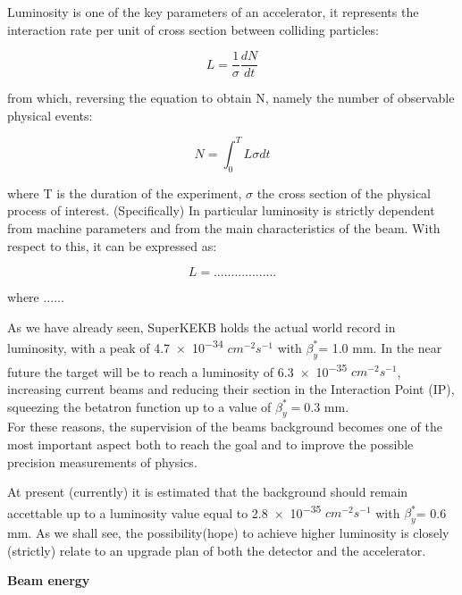 Luminosity is one of the key parameters of an accelerator, it represents the interaction rate per unit of cross section between colliding particles:

\begin{equation}
L =\frac{1}{\sigma}\frac{dN}{dt} 
\end{equation}

from which, reversing the equation to obtain N, namely the number of observable physical events:

\begin{equation}
N = \int_{0}^{T} L\sigma dt
\end{equation}

where T is the duration of the experiment,  $\sigma$ the cross section of the physical process of interest.
(Specifically) In particular luminosity is strictly dependent from machine parameters and from the main characteristics of the beam. With respect to this, it can be expressed as:

\begin{equation}
L = ..................
\end{equation}

where ......

\hspace{.1cm}
As we have already seen, SuperKEKB holds the actual world record in luminosity, with a peak of \num{4.7e-34} $cm^{-2}s^{-1}$ with $\beta^{*}_{y}$= 1.0 mm. In the near future the target will be to reach a luminosity of \num{6.3e-35} $cm^{-2} s^{-1}$, increasing current beams and reducing their section in the Interaction Point (IP), squeezing the betatron function up to a value of $\beta^{*}_{y}= 0.3$ mm.\\
For these reasons, the supervision of the beams background becomes one of the most important aspect both to reach the goal and to improve the possible precision measurements of physics. 

At present (currently) it is estimated that the background should remain accettable up to a luminosity value equal to \num{2.8e-35} $cm^{-2} s^{-1}$ with $\beta^{*}_{y}$= 0.6 mm.
As we shall see, the possibility(hope) to achieve higher luminosity is closely (strictly) relate to an upgrade plan of both the detector and the accelerator.

\hspace{.2cm}


\textbf{Beam energy}\\


